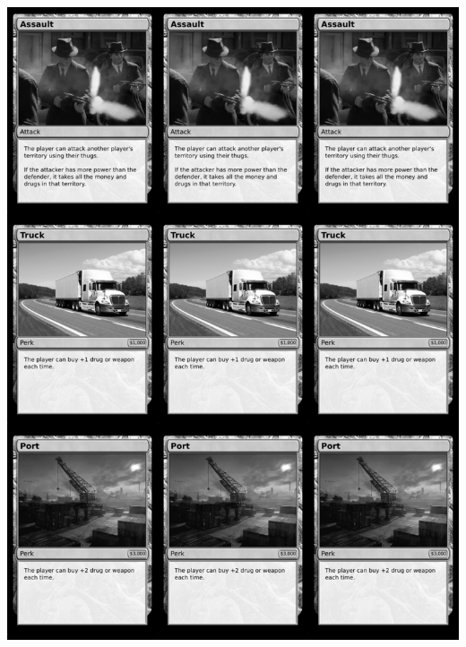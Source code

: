 \documentclass[a4paper]{article}
\begin{document}
\begin{center}
	\centering
	\includegraphics[width=190.5mm,height=266.7mm]{output/temp/page26.png}
\end{center}

\newpage
\end{document}
